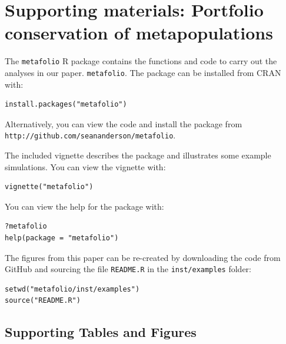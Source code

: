 \section{Supporting materials: Portfolio conservation of metapopulations}


\noindent
The \texttt{metafolio} \textsf{R} package contains the functions and
code to carry out the analyses in our paper. \texttt{metafolio}. The
package can be installed from CRAN with:

\begin{verbatim}
install.packages("metafolio")
\end{verbatim}

\noindent
Alternatively, you can view the code and install the package from\\
\texttt{http://github.com/seananderson/metafolio}.

\noindent
The included vignette describes the package and illustrates some example
simulations. You can view the vignette with:

\begin{verbatim}
vignette("metafolio")
\end{verbatim}

\noindent
You can view the help for the package with:

\begin{verbatim}
?metafolio
help(package = "metafolio")
\end{verbatim}

\noindent
The figures from this paper can be re-created by downloading the code
from GitHub and sourcing the file \texttt{README.R} in the
\texttt{inst/examples} folder:

\begin{verbatim}
setwd("metafolio/inst/examples")
source("README.R")
\end{verbatim}

\clearpage


\renewcommand{\baselinestretch}{\tighttextstretch}
\normalsize


\clearpage
\renewcommand{\baselinestretch}{\textstretch}
\normalsize

\subsection{Supporting Tables and Figures}


